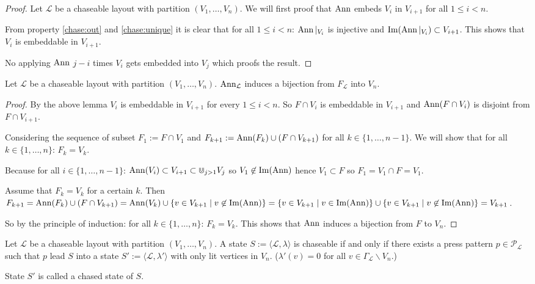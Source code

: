 \begin{proof}
	Let $\mathcal{L}$ be a chaseable layout with partition
	$(V_{1},\ldots,V_{n})$. We will first proof that $\operatorname{Ann}$ embeds $V_{i}$ 
	in $V_{i+1}$ for all $1\le i < n$.
	
	From property \ref{chase:out} and \ref{chase:unique} it is clear that
	for all $1\le i < n$: $\operatorname{Ann}|_{V_{i}}$ is injective and
	$\operatorname{Im}(\operatorname{Ann}|_{V_{i}})\subset V_{i+1}$. This shows that $V_{i}$ is
	embeddable in $V_{i+1}$.
	
	No applying $\operatorname{Ann}$ $j-i$ times $V_{i}$ gets embedded into $V_{j}$ which
	proofs the result.
\end{proof}

\begin{corollary}
	Let $\mathcal{L}$ be a chaseable layout with partition
	$(V_{1},\ldots,V_{n})$. $\operatorname{Ann}_{\mathcal{L}}$ induces a bijection from
	$F_{\mathcal{L}}$ into $V_{n}$.
\end{corollary}

\begin{proof}
	By the above lemma $V_{i}$ is embeddable in $V_{i+1}$ for every $1\le i
	< n$. So $F\cap V_{i}$ is embeddable in $V_{i+1}$ and $\operatorname{Ann}(F\cap
	V_{i})$ is disjoint from $F\cap V_{i+1}$.
	
	Considering the sequence of subset $F_{1} := F\cap V_{1}$ and
	$F_{k+1} := \operatorname{Ann}(F_{k}) \cup (F\cap V_{k+1})$ for all
	$k\in\{1,\ldots,n-1\}$. We will show that for all
	$k \in \{1,\ldots,n\}$: $F_{k} = V_{k}$.
	
	Because for all $i\in\{1,\ldots,n-1\}$: $\operatorname{Ann}(V_{i})\subset V_{i+1}
	\subset \Cup_{j>1} V_{j}$ so $V_{1} \not\in \operatorname{Im}(\operatorname{Ann})$ hence $V_{1}
	\subset F$ so $F_{1} = V_{1} \cap F = V_{1}$.
	
	Assume that $F_{k} = V_{k}$ for a certain $k$. Then $F_{k+1} =
	\operatorname{Ann}(F_{k}) \cup (F\cap V_{k+1}) = \operatorname{Ann}(V_{k}) \cup \{v \in V_{k+1} \thickspace|\thickspace
	v \not\in \operatorname{Im}(\operatorname{Ann})\} = \{v \in V_{k+1} \thickspace|\thickspace v \in \operatorname{Im}(\operatorname{Ann})\} \cup \{v
	\in V_{k+1} \thickspace|\thickspace v \not\in \operatorname{Im}(\operatorname{Ann})\} = V_{k+1}$.
	
	So by the principle of induction: for all $k \in \{1,\ldots,n\}$: $F_{k}
	= V_{k}$. This shows that $\operatorname{Ann}$ induces a bijection from $F$ to
	$V_{n}$. 
\end{proof}

\begin{definition}
	Let $\mathcal{L}$ be a chaseable layout with partition
	$(V_{1},\ldots,V_{n})$. A state	$S:=\langle\mathcal{L},\lambda\rangle$
	is chaseable if and only if there exists a press pattern
	$p\in\mathcal{P}_{\mathcal{L}}$ such that $p$ lead $S$ into a state
	$S':=\langle\mathcal{L},\lambda'\rangle$ with only lit vertices in
	$V_{n}$. ($\lambda'(v)=0$ for all $v\in\Gamma_{\mathcal{L}}\backslash
	V_{n}$.)   

	State $S'$ is called a chased state of $S$.
\end{definition}

